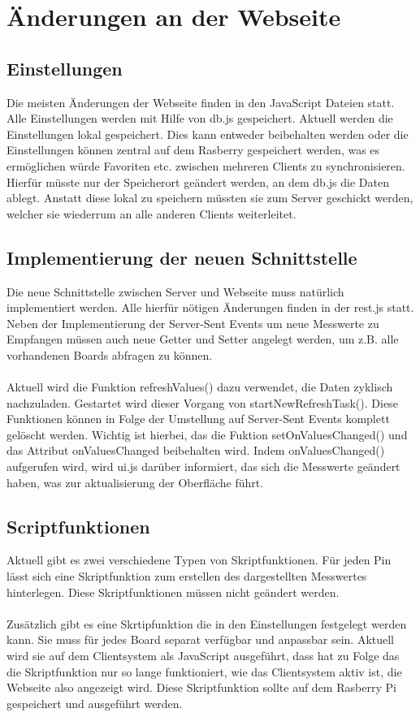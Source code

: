 \section{Änderungen an der Webseite}
\subsection{Einstellungen}
Die meisten Änderungen der Webseite finden in den JavaScript Dateien statt. Alle
Einstellungen werden mit Hilfe von \textrm{db.js} gespeichert. Aktuell werden
die Einstellungen lokal gespeichert. Dies kann entweder beibehalten werden oder
die Einstellungen können zentral auf dem Rasberry gespeichert werden, was es
ermöglichen würde Favoriten etc. zwischen mehreren Clients zu synchronisieren.
Hierfür müsste nur der Speicherort geändert werden, an dem \textrm{db.js} die
Daten ablegt. Anstatt diese lokal zu speichern müssten sie zum Server geschickt
werden, welcher sie wiederrum an alle anderen Clients weiterleitet.

\subsection{Implementierung der neuen Schnittstelle}
Die neue Schnittstelle zwischen Server und Webseite muss natürlich implementiert
werden. Alle hierfür nötigen Änderungen finden in der \textrm{rest.js} statt.
Neben der Implementierung der Server-Sent Events um neue Messwerte zu
Empfangen müssen auch neue Getter und Setter angelegt werden, um z.B. alle
vorhandenen Boards abfragen zu können.\\
\\
Aktuell wird die Funktion \textrm{refreshValues()} dazu verwendet, die Daten
zyklisch nachzuladen. Gestartet wird dieser Vorgang von 
\textrm{startNewRefreshTask()}. Diese Funktionen können in Folge der Umstellung
auf Server-Sent Events komplett gelöscht werden. Wichtig ist hierbei, das die
Fuktion \textrm{setOnValuesChanged()} und das Attribut
\textrm{onValuesChanged} beibehalten wird. Indem \textrm{onValuesChanged()}
aufgerufen wird, wird \textrm{ui.js} darüber informiert, das sich die Messwerte
geändert haben, was zur aktualisierung der Oberfläche führt.

\subsection{Scriptfunktionen}
Aktuell gibt es zwei verschiedene Typen von Skriptfunktionen. Für jeden Pin
lässt sich eine Skriptfunktion zum erstellen des dargestellten Messwertes
hinterlegen. Diese Skriptfunktionen müssen nicht geändert werden.\\
\\
Zusätzlich gibt es eine Skrtipfunktion die in den Einstellungen festgelegt
werden kann. Sie muss für jedes Board separat verfügbar und anpassbar sein.
Aktuell wird sie auf dem Clientsystem als JavaScript ausgeführt, dass hat zu
Folge das die Skriptfunktion nur so lange funktioniert, wie das Clientsystem
aktiv ist, die Webseite also angezeigt wird. Diese Skriptfunktion sollte auf dem
Rasberry Pi gespeichert und ausgeführt werden.

